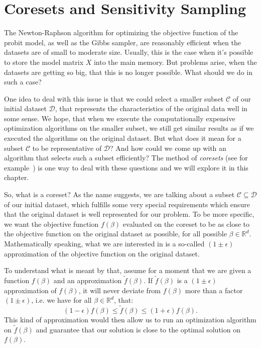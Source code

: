 \section{Coresets and Sensitivity Sampling}

The Newton-Raphson algorithm for optimizing the
objective function of the probit model,
as well as the Gibbs sampler, are reasonably efficient
when the datasets are of small to moderate size.
Usually, this is the case when it's possible to
store the model matrix $X$ into the main memory.
But problems arise, when the datasets are getting
so big, that this is no longer possible.
What should we do in such a case?

One idea to deal with this issue is that we could
select a smaller subset $\mathcal{C}$ of our initial dataset
$\mathcal{D}$, that represents the characteristics of
the original data well in some sense.
We hope, that when we execute the computationally expensive
optimization algorithms on the smaller subset,
we still get similar results as if we executed the
algorithms on the original dataset.
But what does it mean for a subset $\mathcal{C}$
to be representative of $\mathcal{D}$?
And how could we come up with an algorithm
that selects such a subset efficiently?
The method of \textit{coresets}
(see for example~\cite{munteanu-coresets-introduction}) is one way to
deal with these questions and we will explore it in this chapter.

So, what is a coreset? As the name suggests, we are
talking about a subset $\mathcal{C} \subseteq \mathcal{D}$
of our initial dataset, which fulfills some very special
requirements which ensure that the original
dataset is well represented for our problem.
To be more specific, we want the objective function
$f(\beta)$ evaluated on the coreset to be
as close to the objective function on the original dataset as possible,
for all possible $\beta \in \mathbb{R}^d$.
Mathematically speaking, what we are interested in is
a so-called $(1 \pm \epsilon)$ approximation of the
objective function on the original dataset.

To understand what is meant by that, assume for a moment
that we are given a function $f(\beta)$ and an
approximation $\tilde f(\beta)$.
If $\tilde f(\beta)$ is a $(1 \pm \epsilon)$ approximation
of $f(\beta)$, it will never deviate from $f(\beta)$
more than a factor $(1 \pm \epsilon)$, i.e.
we have for all $\beta \in \mathbb{R}^d$, that:
\begin{equation*}
    (1 - \epsilon) f(\beta) \leq \tilde f(\beta) \leq (1 + \epsilon) f(\beta).
\end{equation*}
This kind of approximation would then allow us to run
an optimization algorithm on $\tilde f(\beta)$ and
guarantee that our solution is close to the
optimal solution on $f(\beta)$.

